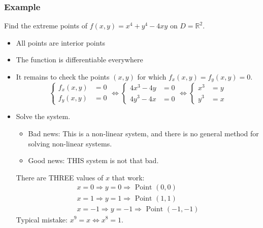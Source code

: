 \begin{frame}
  \frametitle{Example}

Find the extreme points of $f(x,y) = x^4+y^4-4xy$ on $D=\mathbb{R}^2$.

\begin{itemize}
  \item \pause  All points are interior points%
  \item \pause The function is differentiable everywhere
  \item \pause It remains to check the points $(x,y)$ for which $f_x(x,y)=f_y(x,y)=0$.
  $$\left\{ \begin{array}{ll}
    f_x(x,y) & = 0 \\
    f_y(x,y) & = 0
  \end{array}
  \right.
  \Longleftrightarrow
  \left\{ \begin{array}{ll}
    4x^3-4y & = 0 \\
    4y^3-4x & = 0
  \end{array}
  \right.
  \Longleftrightarrow
  \left\{ \begin{array}{ll}
    x^3 & = y \\
    y^3 & = x
  \end{array}
  \right. $$
  \item \pause Solve the system.
  \begin{itemize}
    \item \pause Bad news: \pause This is a non-linear system, and there is no general method for solving non-linear systems.
    \item \pause Good news: \pause THIS system is not that bad.\pause
  \end{itemize}
  There are THREE values of $x$ that work:
  \begin{align*}
    x=0 \Longrightarrow y=0 \Longrightarrow \text{ Point } (0,0)\\
    x=1 \Longrightarrow y=1 \Longrightarrow \text{ Point } (1,1) \\
    x=-1 \Longrightarrow y=-1 \Longrightarrow \text{ Point } (-1,-1)
  \end{align*}
  \pause Typical mistake: \pause $x^9 = x \Longleftrightarrow x^8=1$.
\end{itemize}
\end{frame}

